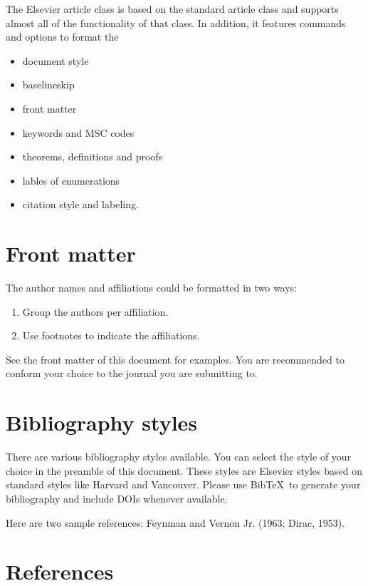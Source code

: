 \documentclass[]{elsarticle} %
\begin{document}
The Elsevier article class is based on the standard article class and
supports almost all of the functionality of that class. In addition, it
features commands and options to format the

\begin{itemize}
\item
  document style
\item
  baselineskip
\item
  front matter
\item
  keywords and MSC codes
\item
  theorems, definitions and proofs
\item
  lables of enumerations
\item
  citation style and labeling.
\end{itemize}

\hypertarget{front-matter}{%
\section{Front matter}\label{front-matter}}

The author names and affiliations could be formatted in two ways:

\begin{enumerate}
\def\labelenumi{(\arabic{enumi})}
\item
  Group the authors per affiliation.
\item
  Use footnotes to indicate the affiliations.
\end{enumerate}

See the front matter of this document for examples. You are recommended
to conform your choice to the journal you are submitting to.

\hypertarget{bibliography-styles}{%
\section{Bibliography styles}\label{bibliography-styles}}

There are various bibliography styles available. You can select the
style of your choice in the preamble of this document. These styles are
Elsevier styles based on standard styles like Harvard and Vancouver.
Please use BibTeX~to generate your bibliography and include DOIs
whenever available.

Here are two sample references: Feynman and Vernon Jr. (1963; Dirac,
1953).

\hypertarget{references}{%
\section*{References}\label{references}}
\end{document}
